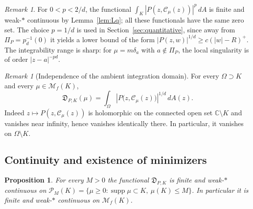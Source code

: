 \documentclass[reqno]{amsart}
\newtheorem{proposition}[theorem]{Proposition}
\theoremstyle{definition}
\theoremstyle{remark}
\newtheorem{remark}[theorem]{Remark}
\newcommand{\bC}{\mathbb C}
\newcommand{\M}{\mathcal M}
\newcommand{\Cauchy}{\mathcal C}
\newcommand{\supp}{\operatorname{supp}}
\begin{document}
\begin{remark}\label{rem:exponent}
For $0<p<2/d$, the functional
$\int_K|P(z,\Cauchy_\mu(z))|^p\,dA$ is finite and weak-$*$ continuous by
Lemma~\ref{lem:Lq}; all these functionals have the same zero set.  The choice
$p=1/d$ is used in Section~\ref{sec:quantitative}, since away from
$\Pi_P=p_d^{-1}(0)$ it yields a lower bound of the form
$|P(z,w)|^{1/d}\ge c(|w|-R)^+$.  The integrability range is sharp: for
$\mu=m\delta_a$ with $a\notin\Pi_P$, the local singularity is of order
$|z-a|^{-pd}$.
\end{remark}

\begin{remark}[Independence of the ambient integration domain]
\label{rem:ambient}
For every $\Omega \supset K$ and every $\mu\in\M_f(K)$,
\begin{equation}\label{eq:ambient}
 \mathfrak D_{P,K}(\mu)
 =\int_\Omega
 \left|P\bigl(z,\Cauchy_\mu(z)\bigr)\right|^{1/d}\,dA(z).
\end{equation}
Indeed $z\mapsto P(z,\Cauchy_\mu(z))$ is holomorphic on the connected open set
$\bC\setminus K$ and vanishes near infinity, hence vanishes identically there.
In particular, it vanishes on $\Omega\setminus K$.
\end{remark}

\subsection{Continuity and existence of minimizers}

\begin{proposition}\label{prop:defect-continuity}
For every $M>0$ the functional $\mathfrak D_{P,K}$ is finite and weak-$*$
continuous on
$\mathcal P_M(K)=\{\mu\geq0:\supp\mu\subset K,\ \mu(K)\leq M\}$.  In
particular it is finite and weak-$*$ continuous on $\M_f(K)$.
\end{proposition}
\end{document}

